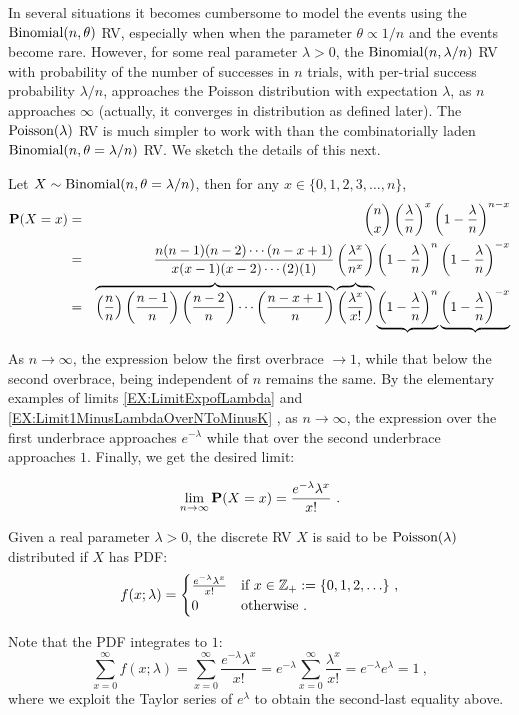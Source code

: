 In several situations it becomes cumbersome to model the events using the $\mbox{{\rm Binomial}}(n,\theta)$ RV, especially when when the parameter $\theta \propto 1/n$ and the events become rare.  However, for some real parameter $\lambda>0$, the $\mbox{{\rm Binomial}}(n,\lambda/n)$ RV with probability of the number of successes in $n$ trials, with per-trial success probability $\lambda/n$, approaches the Poisson distribution with expectation $\lambda$, as $n$ approaches $\infty$ (actually, it converges in distribution as defined later).  The $\mbox{{\rm Poisson}}(\lambda)$ RV is much simpler to work with than the combinatorially laden $\mbox{{\rm Binomial}}(n,\theta=\lambda/n)$ RV.  We sketch the details of this next.

Let $X \sim \mbox{{\rm Binomial}}(n,\theta=\lambda/n)$, then for any $x \in \{0,1,2,3,\ldots,n\}$,
\begin{eqnarray}
\mathbf{P}(X=x)
&=&
\binom{n}{x} \left( \frac{\lambda}{n} \right)^x \left( 1- \frac{\lambda}{n} \right)^{n-x} \notag \\
&=& \frac{n(n-1)(n-2)\cdots(n-x+1)}{x(x-1)(x-2)\cdots (2)(1)}
\left( \frac{\lambda^x}{n^x} \right)
\left( 1- \frac{\lambda}{n} \right)^n
\left( 1- \frac{\lambda}{n} \right)^{-x} \notag \\
&=&
\overbrace{\left( \frac{n}{n} \right) \left( \frac{n-1}{n} \right) \left( \frac{n-2}{n} \right) \cdots \left( \frac{n-x+1}{n} \right)}
\overbrace{\left( \frac{\lambda^x}{x!} \right)}
\underbrace{\left( 1- \frac{\lambda}{n} \right)^n}
\underbrace{\left( 1- \frac{\lambda}{n} \right)^{-x}}  \notag \\
\end{eqnarray}

As $n \to \infty$, the expression below the first overbrace $\to 1$, while that below the second overbrace, being independent of $n$ remains the same.  By the elementary examples of limits
\ref*{EX:LimitExpofLambda} and \ref*{EX:Limit1MinusLambdaOverNToMinusK}%
, as $n \to \infty$, the expression over the first underbrace approaches $e^{-\lambda}$ while that over the second underbrace approaches $1$.  Finally, we get the desired limit:

\[
\lim_{n \to \infty} \mathbf{P}(X=x)
= \frac{ e^{-\lambda} \lambda^x}{x!}  \ .
\]
\begin{model}\label{M:Poisson}
Given a real parameter $\lambda>0$, the discrete RV $X$ is said to be $\mbox{{\rm Poisson}}(\lambda)$ distributed if $X$ has PDF:
\begin{equation}\label{E:Poissonpdf}
f(x;\lambda) =
\begin{cases}
 \frac{ e^{-\lambda} \lambda^x}{x!} & \text{if $x \in \mathbb{Z}_+ := \{0,1,2,\ldots\}$} \ , \\
0 & \text{otherwise} \ .
\end{cases}
\end{equation}

Note that the PDF integrates to $1$:
\[
\sum_{x=0}^{\infty} f(x;\lambda)
= \sum_{x=0}^{\infty}  \frac{ e^{-\lambda} \lambda^x}{x!}
=  e^{-\lambda} \sum_{x=0}^{\infty}  \frac{\lambda^x}{x!}
=  e^{-\lambda} e^{\lambda}
= 1 \ ,
\]
where we exploit the Taylor series of $e^{\lambda}$ to obtain the second-last equality above.
\end{model}

